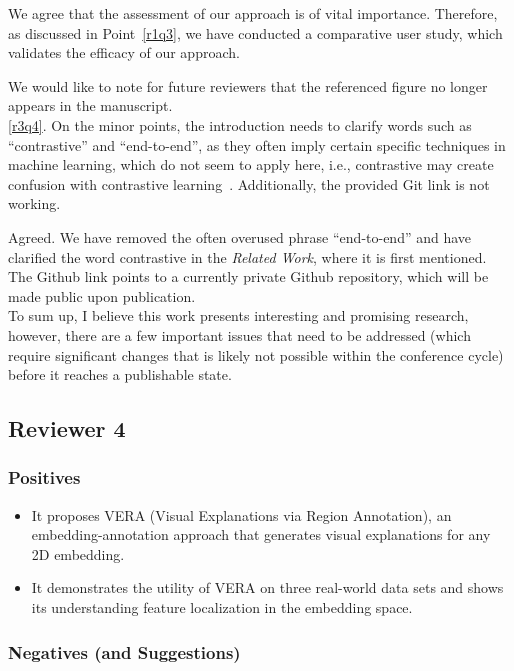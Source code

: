 \documentclass{article}
\newcounter{rtaskno}
\newcommand{\rtask}[1]{\refstepcounter{rtaskno}\label{#1}}
\newcommand{\reviewc}[2]{\begin{leftbar}\noindent\rtask{#1}\ref{#1}. #2\end{leftbar}}
\newcommand{\review}[1]{\begin{leftbar}\noindent #1\end{leftbar}}
\newcommand{\answer}[1]{\noindent #1\\[0mm]}
\newlength{\leftbarwidth}
\newlength{\leftbarsep}
\renewenvironment{leftbar}{%
    \def\FrameCommand{{\color{black}{\vrule width \leftbarwidth\relax\hspace {\leftbarsep}}}}%
    \MakeFramed {\advance \hsize -\width \FrameRestore }%
}{\endMakeFramed}
\begin{document}
\answer{We agree that the assessment of our approach is of vital importance. Therefore, as discussed in Point~\ref{r1q3}, we have conducted a comparative user study, which validates the efficacy of our approach.

We would like to note for future reviewers that the referenced figure no longer appears in the manuscript.}


\reviewc{r3q4}{On the minor points, the introduction needs to clarify words such as “contrastive” and “end-to-end”, as they often imply certain specific techniques in machine learning, which do not seem to apply here, i.e., contrastive may create confusion with contrastive learning~\citep{Chen2020}. Additionally, the provided Git link is not working.}

\answer{Agreed. We have removed the often overused phrase ``end-to-end'' and have clarified the word contrastive in the \textit{Related Work}, where it is first mentioned. The Github link points to a currently private Github repository, which will be made public upon publication.}


\review{To sum up, I believe this work presents interesting and promising research, however, there are a few important issues that need to be addressed (which require significant changes that is likely not possible within the conference cycle) before it reaches a publishable state.}


\subsection*{Reviewer 4}

\subsubsection*{Positives}
\review{
\begin{itemize}
\item It proposes VERA (Visual Explanations via Region Annotation), an embedding-annotation approach that generates visual explanations for any 2D embedding.

\item It demonstrates the utility of VERA on three real-world data sets and shows its understanding feature localization in the embedding space.
\end{itemize}
}

\subsubsection*{Negatives (and Suggestions)}
\end{document}
